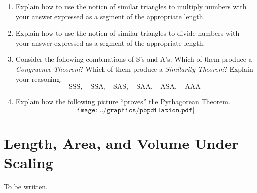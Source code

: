 \begin{problems}
\begin{enumerate}
\item Explain how to use the notion of similar triangles to multiply
  numbers with your answer expressed as a segment of the appropriate
  length.

\item Explain how to use the notion of similar triangles to divide
  numbers with your answer expressed as a segment of the appropriate
  length.


\item Consider the following combinations of S's and A's. Which of
  them produce a \textit{Congruence Theorem}? Which of them produce a
  \textit{Similarity Theorem}? Explain your reasoning.
\[
\text{SSS},\quad \text{SSA},\quad \text{SAS},\quad 
\text{SAA},\quad \text{ASA},\quad \text{AAA} 
\]


\item Explain how the following picture ``proves'' the Pythagorean Theorem.
\[
\texttt{[image: ../graphics/pbpdilation.pdf]}
\]



\end{enumerate}
\end{problems}


\section{Length, Area, and Volume Under Scaling}

To be written. 





